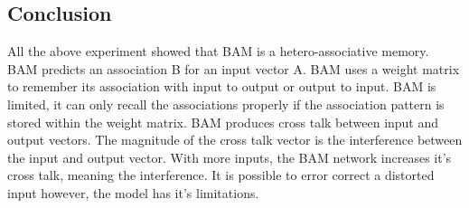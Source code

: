 \documentclass[12pt]{article}
\begin{document}
\subsection{Conclusion}

All the above experiment showed that BAM is a hetero-associative memory. BAM predicts an association B for an input vector A. BAM uses a weight matrix to remember its association with input to output or output to input. BAM is limited, it can only recall the associations properly if the association pattern is stored within the weight matrix. BAM produces cross talk between input and output vectors. The magnitude of the cross talk vector is the interference between the input and output vector. With more inputs, the BAM network increases it's cross talk, meaning the interference. It is possible to error correct a distorted input however, the model has it's limitations.  
\end{document}
